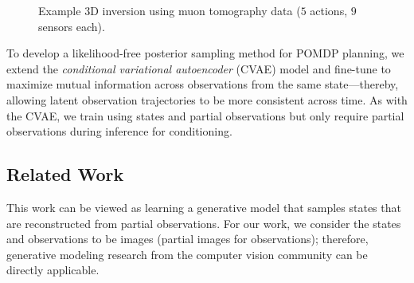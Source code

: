 \begin{figure}[t]
{
    }
    \caption{Example 3D inversion using muon tomography data ($5$ actions, $9$ sensors each).}
    \label{fig:muon_intrusion_diagram}
\end{figure}

To develop a likelihood-free posterior sampling method for POMDP planning, we extend the \textit{conditional variational autoencoder} (CVAE) model \cite{sohn2015learning} and fine-tune to maximize mutual information across observations from the same state---thereby, allowing latent observation trajectories to be more consistent across time.
As with the CVAE, we train using states and partial observations but only require partial observations during inference for conditioning.


\subsection{Related Work}
This work can be viewed as learning a generative model that samples states that are reconstructed from partial observations.
For our work, we consider the states and observations to be images (partial images for observations); therefore, generative modeling research from the computer vision community can be directly applicable.

